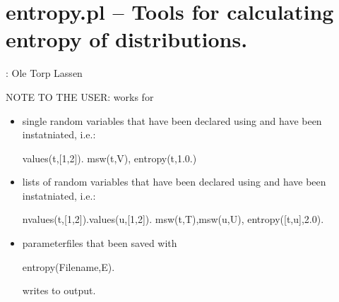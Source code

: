 


\section{entropy.pl -- Tools for calculating entropy of distributions.}

\label{sec:entropy}

\begin{tags}
: Ole Torp Lassen
\end{tags}

NOTE TO THE USER:  works for

\begin{itemize}
    \item single random variables that have been declared using  and have been instatniated, i.e.:

\begin{code}
values(t,[1,2]).
msw(t,V),
entropy(t,1.0.)
\end{code}

    \item lists of random variables that have been declared using  and have been instatniated, i.e.:

\begin{code}
nvalues(t,[1,2]).values(u,[1,2]).
msw(t,T),msw(u,U),
entropy([t,u],2.0).
\end{code}

    \item parameterfiles that been saved with 

\begin{code}
entropy(Filename,E).
\end{code}

 writes to output.
\end{itemize}

\vspace{0.7cm}
